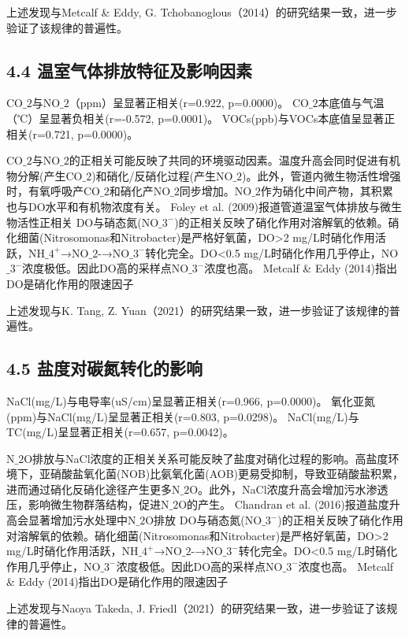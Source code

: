 \documentclass[12pt]{article}
\begin{document}
上述发现与Metcalf \& Eddy, G. Tchobanoglous（2014）的研究结果一致，进一步验证了该规律的普遍性。

\subsection{4.4 温室气体排放特征及影响因素}

CO$\_2$与NO$\_2$（ppm）呈显著正相关(r=0.922, p=0.0000)。
CO$\_2$本底值与气温（℃）呈显著负相关(r=-0.572, p=0.0001)。
VOCs(ppb)与VOCs本底值呈显著正相关(r=0.721, p=0.0000)。

CO$\_2$与NO$\_2$的正相关可能反映了共同的环境驱动因素。温度升高会同时促进有机物分解(产生CO$\_2$)和硝化/反硝化过程(产生NO$\_2$)。此外，管道内微生物活性增强时，有氧呼吸产CO$\_2$和硝化产NO$\_2$同步增加。NO$\_2$作为硝化中间产物，其积累也与DO水平和有机物浓度有关。
Foley et al. (2009)报道管道温室气体排放与微生物活性正相关
DO与硝态氮(NO$\_3^-$)的正相关反映了硝化作用对溶解氧的依赖。硝化细菌(Nitrosomonas和Nitrobacter)是严格好氧菌，DO>2 mg/L时硝化作用活跃，NH$\_4^+$→NO$\_2$-→NO$\_3^-$转化完全。DO<0.5 mg/L时硝化作用几乎停止，NO$\_3^-$浓度极低。因此DO高的采样点NO$\_3^-$浓度也高。
Metcalf \& Eddy (2014)指出DO是硝化作用的限速因子

上述发现与K. Tang, Z. Yuan（2021）的研究结果一致，进一步验证了该规律的普遍性。

\subsection{4.5 盐度对碳氮转化的影响}

NaCl(mg/L)与电导率(uS/cm)呈显著正相关(r=0.966, p=0.0000)。
氧化亚氮(ppm)与NaCl(mg/L)呈显著正相关(r=0.803, p=0.0298)。
NaCl(mg/L)与TC(mg/L)呈显著正相关(r=0.657, p=0.0042)。

N$\_2$O排放与NaCl浓度的正相关关系可能反映了盐度对硝化过程的影响。高盐度环境下，亚硝酸盐氧化菌(NOB)比氨氧化菌(AOB)更易受抑制，导致亚硝酸盐积累，进而通过硝化反硝化途径产生更多N$\_2$O。此外，NaCl浓度升高会增加污水渗透压，影响微生物群落结构，促进N$\_2$O的产生。
Chandran et al. (2016)报道盐度升高会显著增加污水处理中N$\_2$O排放
DO与硝态氮(NO$\_3^-$)的正相关反映了硝化作用对溶解氧的依赖。硝化细菌(Nitrosomonas和Nitrobacter)是严格好氧菌，DO>2 mg/L时硝化作用活跃，NH$\_4^+$→NO$\_2$-→NO$\_3^-$转化完全。DO<0.5 mg/L时硝化作用几乎停止，NO$\_3^-$浓度极低。因此DO高的采样点NO$\_3^-$浓度也高。
Metcalf \& Eddy (2014)指出DO是硝化作用的限速因子

上述发现与Naoya Takeda, J. Friedl（2021）的研究结果一致，进一步验证了该规律的普遍性。
\end{document}
